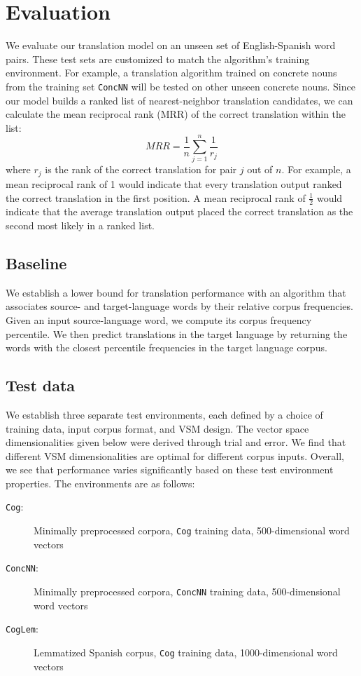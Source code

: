 \documentclass[11pt]{article}
\begin{document}
\section{Evaluation}
\label{sec:evaluation}
We evaluate our translation model on an unseen set of English-Spanish word
pairs. These test sets are customized to match the algorithm's training
environment. For example, a translation algorithm trained on concrete nouns from
the training set \texttt{ConcNN} will be tested on other unseen concrete nouns.
Since our model builds a ranked list of nearest-neighbor translation candidates,
we can calculate the mean reciprocal rank (MRR) of the correct translation
within the list:
\begin{equation}
    \textit{MRR} = \frac{1}{n}\sum_{j=1}^n \frac{1}{r_j}
\end{equation}
where $r_j$ is the rank of the correct translation for pair $j$ out of $n$. For
example, a mean reciprocal rank of 1 would indicate that every translation
output ranked the correct translation in the first position. A mean reciprocal
rank of $\frac{1}{2}$ would indicate that the average translation output placed
the correct translation as the second most likely in a ranked list.

\subsection{Baseline}
\label{subsec:baseline}

We establish a lower bound for translation performance with an algorithm that
associates source- and target-language words by their relative corpus
frequencies. Given an input source-language word, we compute its corpus
frequency percentile. We then predict translations in the target language by
returning the words with the closest percentile frequencies in the target
language corpus.

\subsection{Test data}
\label{subsec:test-data}

We establish three separate test environments, each defined by a choice of
training data, input corpus format, and VSM design. The vector space
dimensionalities given below were derived through trial and error. We find that
different VSM dimensionalities are optimal for different corpus inputs. Overall,
we see that performance varies significantly based on these test environment
properties. The environments are as follows:
\begin{description}
\item[\texttt{Cog}:] Minimally preprocessed corpora, \texttt{Cog} training data,
  500-dimensional word vectors %
\item[\texttt{ConcNN}:] Minimally preprocessed corpora, \texttt{ConcNN} training
  data, 500-dimensional word
  vectors %
\item[\texttt{CogLem}:] Lemmatized Spanish corpus, \texttt{Cog} training data,
  1000-dimensional word vectors %
\end{description}
\end{document}
